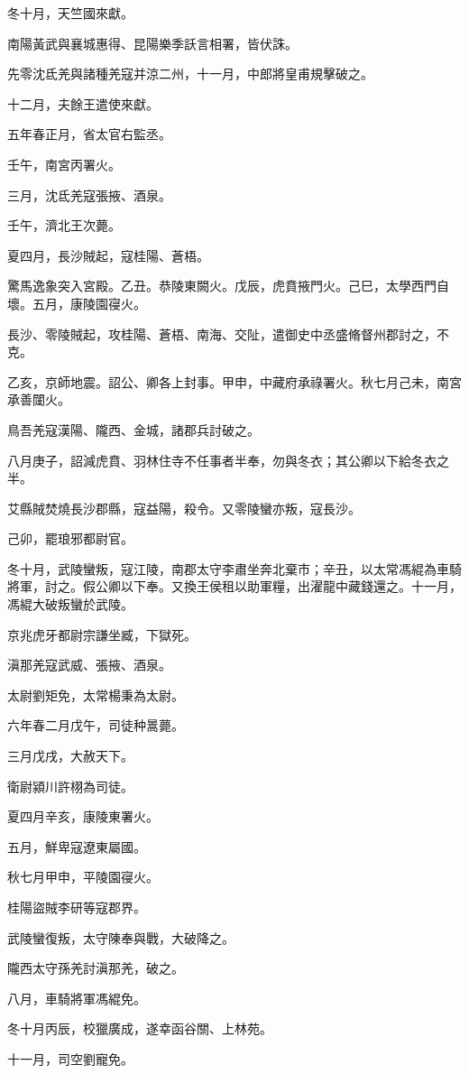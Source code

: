 \begin{pinyinscope}
冬十月，天竺國來獻。

南陽黃武與襄城惠得、昆陽樂季訞言相署，皆伏誅。

先零沈氐羌與諸種羌寇并涼二州，十一月，中郎將皇甫規擊破之。

十二月，夫餘王遣使來獻。

五年春正月，省太官右監丞。

壬午，南宮丙署火。

三月，沈氐羌寇張掖、酒泉。

壬午，濟北王次薨。

夏四月，長沙賊起，寇桂陽、蒼梧。

驚馬逸象突入宮殿。乙丑。恭陵東闕火。戊辰，虎賁掖門火。己巳，太學西門自壞。五月，康陵園寑火。

長沙、零陵賊起，攻桂陽、蒼梧、南海、交阯，遣御史中丞盛脩督州郡討之，不克。

乙亥，京師地震。詔公、卿各上封事。甲申，中藏府承祿署火。秋七月己未，南宮承善闥火。

鳥吾羌寇漢陽、隴西、金城，諸郡兵討破之。

八月庚子，詔減虎賁、羽林住寺不任事者半奉，勿與冬衣；其公卿以下給冬衣之半。

艾縣賊焚燒長沙郡縣，寇益陽，殺令。又零陵蠻亦叛，寇長沙。

己卯，罷琅邪都尉官。

冬十月，武陵蠻叛，寇江陵，南郡太守李肅坐奔北棄市；辛丑，以太常馮緄為車騎將軍，討之。假公卿以下奉。又換王侯租以助軍糧，出濯龍中藏錢還之。十一月，馮緄大破叛蠻於武陵。

京兆虎牙都尉宗謙坐臧，下獄死。

滇那羌寇武威、張掖、酒泉。

太尉劉矩免，太常楊秉為太尉。

六年春二月戊午，司徒种暠薨。

三月戊戌，大赦天下。

衛尉潁川許栩為司徒。

夏四月辛亥，康陵東署火。

五月，鮮卑寇遼東屬國。

秋七月甲申，平陵園寑火。

桂陽盜賊李研等寇郡界。

武陵蠻復叛，太守陳奉與戰，大破降之。

隴西太守孫羌討滇那羌，破之。

八月，車騎將軍馮緄免。

冬十月丙辰，校獵廣成，遂幸函谷關、上林苑。

十一月，司空劉寵免。


\end{pinyinscope}
